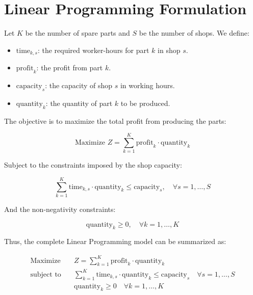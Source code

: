 \documentclass{article}
\begin{document}
\section*{Linear Programming Formulation}

Let \( K \) be the number of spare parts and \( S \) be the number of shops. We define:

\begin{itemize}
    \item \( \text{time}_{k,s} \): the required worker-hours for part \( k \) in shop \( s \).
    \item \( \text{profit}_{k} \): the profit from part \( k \).
    \item \( \text{capacity}_{s} \): the capacity of shop \( s \) in working hours.
    \item \( \text{quantity}_{k} \): the quantity of part \( k \) to be produced.
\end{itemize}

The objective is to maximize the total profit from producing the parts:

\[
\text{Maximize } Z = \sum_{k=1}^{K} \text{profit}_{k} \cdot \text{quantity}_{k}
\]

Subject to the constraints imposed by the shop capacity:

\[
\sum_{k=1}^{K} \text{time}_{k,s} \cdot \text{quantity}_{k} \leq \text{capacity}_{s}, \quad \forall s = 1,\ldots,S
\]

And the non-negativity constraints:

\[
\text{quantity}_{k} \geq 0, \quad \forall k = 1,\ldots,K
\]

Thus, the complete Linear Programming model can be summarized as:

\[
\begin{aligned}
    \text{Maximize} \quad & Z = \sum_{k=1}^{K} \text{profit}_{k} \cdot \text{quantity}_{k} \\
    \text{subject to} \quad & \sum_{k=1}^{K} \text{time}_{k,s} \cdot \text{quantity}_{k} \leq \text{capacity}_{s} \quad \forall s = 1,\ldots,S \\
    & \text{quantity}_{k} \geq 0 \quad \forall k = 1,\ldots,K
\end{aligned}
\]
\end{document}
